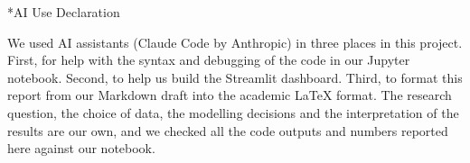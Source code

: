 \documentclass[12pt,a4paper]{article}
\makeatletter
\renewcommand\section{\@startsection{section}{1}{\z@}{-2.2ex \@plus -0.5ex \@minus -.2ex}{1ex \@plus .2ex}{\normalfont\Large\bfseries}}
\makeatother
\begin{document}
\section*{AI Use Declaration}

We used AI assistants (Claude Code by Anthropic) in three places in this project. First, for help with the syntax and debugging of the code in our Jupyter notebook. Second, to help us build the Streamlit dashboard. Third, to format this report from our Markdown draft into the academic LaTeX format. The research question, the choice of data, the modelling decisions and the interpretation of the results are our own, and we checked all the code outputs and numbers reported here against our notebook.

\end{document}
